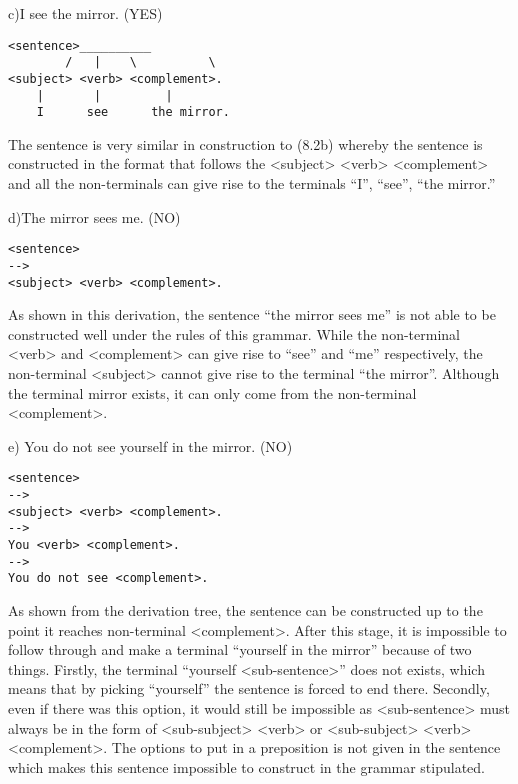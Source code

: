 \documentclass{article}
\begin{document}
\begin{alphabetize}
\item c)I see the mirror. (YES) 
\begin{lstlisting}
<sentence>__________
        /   |    \          \
<subject> <verb> <complement>.
    |       |         |
    I      see      the mirror.
\end{lstlisting} \linebreak
The sentence is very similar in construction to (8.2b) whereby the sentence is constructed in the format that follows the <subject> <verb> <complement> and all the non-terminals can give rise to the terminals “I”, “see”, “the mirror.”\linebreak

\item d)The mirror sees me. (NO) 
\begin{lstlisting}
<sentence> 
-->  
<subject> <verb> <complement>.
\end{lstlisting} \linebreak
As shown in this derivation, the sentence “the mirror sees me” is not able to be constructed well under the rules of this grammar. While the non-terminal <verb> and <complement> can give rise to “see” and “me” respectively, the non-terminal <subject> cannot give rise to the terminal “the mirror”. Although the terminal mirror exists, it can only come from the non-terminal <complement>.\linebreak

\item e)	You do not see yourself in the mirror. (NO) 
\begin{lstlisting}
<sentence> 
-->  
<subject> <verb> <complement>.
--> 
You <verb> <complement>.
--> 
You do not see <complement>.
\end{lstlisting} \linebreak
As shown from the derivation tree, the sentence can be constructed up to the point it reaches non-terminal <complement>. After this stage, it is impossible to follow through and make a terminal “yourself in the mirror” because of two things. Firstly, the terminal “yourself <sub-sentence>” does not exists, which means that by picking “yourself” the sentence is forced to end there. Secondly, even if there was this option, it would still be impossible as <sub-sentence> must always be in the form of <sub-subject> <verb> or <sub-subject> <verb> <complement>. The options to put in a preposition is not given in the sentence which makes this sentence impossible to construct in the grammar stipulated.\linebreak


\end{alphabetize}
\end{document}
